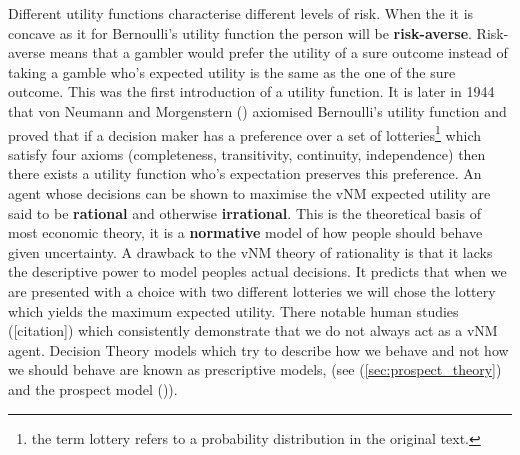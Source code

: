 Different utility functions characterise different levels of risk. When the it is concave as it for Bernoulli's utility function
the person will be \textbf{risk-averse}. Risk-averse means that a gambler would prefer the utility of a sure outcome instead of 
taking a gamble who's expected utility is the same as the one of the sure outcome. 
This was the first introduction of a utility function.
It is later in 1944 that von Neumann and Morgenstern (\cite{VonNeumann1944}) axiomised Bernoulli's utility function 
and proved that if a decision maker has a preference over a set of lotteries\footnote{the term lottery refers 
to a probability distribution in the original text.} which satisfy four axioms
(completeness, transitivity, continuity, independence) then there exists a utility function who's expectation 
preserves this preference.
An agent whose decisions can be shown to maximise the vNM expected utility are said to be \textbf{rational} 
and otherwise \textbf{irrational}. This is the theoretical basis of most economic theory, it is
a \textbf{normative} model of how people should behave given uncertainty. 
A drawback to the vNM theory of rationality is that it lacks the descriptive power to model peoples actual 
decisions. It predicts that when we are presented with a choice with two different lotteries we will chose 
the lottery which yields the maximum expected utility. There notable human studies ([citation]) which consistently 
demonstrate that we do not always act as a vNM agent.  
Decision Theory models which try to describe how we behave and not how we should behave are known as prescriptive 
models, (see (\ref{sec:prospect_theory}) and the prospect model (\cite{Kahneman79prospecttheory})).






